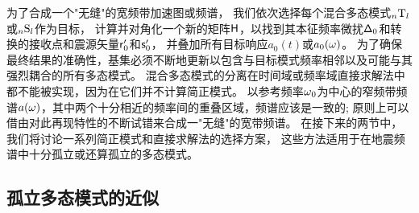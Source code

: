 {{{{%

为了合成一个"无缝"的宽频带加速图或频谱，
我们依次选择每个混合多态模式${}_n{\rm T}_l$或${}_n{\rm S}_l$作为目标，
计算并对角化一个新的矩阵$\mbox{${\sf H}$}$，以找到其本征频率微扰$\mbox{${\sf \Delta}$}_0$和转换的接收点和震源矢量$\mbox{${\sf r}$}_0^{\prime}$和$\mbox{${\sf s}$}_0^{\prime}$，
并叠加所有目标响应$a_0(t)$或$a_0(\mbox{$\omega$})$。
为了确保最终结果的准确性，基集必须不断地更新以包含与目标模式频率相邻以及可能与其强烈耦合的所有多态模式。
混合多态模式的分离在时间域或频率域直接求解法中都不能被实现，因为在它们并不计算简正模式。
以参考频率$\mbox{$\omega$}_0$为中心的窄频带频谱$a(\mbox{$\omega$})$，其中两个十分相近的频率间的重叠区域，频谱应该是一致的;
原则上可以借由对此再现特性的不断试错来合成一"无缝"的宽带频谱。
在接下来的两节中，我们将讨论一系列简正模式和直接求解法的选择方案，
这些方法适用于在地震频谱中十分孤立或还算孤立的多态模式。
%
%


\subsection{孤立多态模式的近似}
%
%
\label{13.sec.isola}

}}}}
